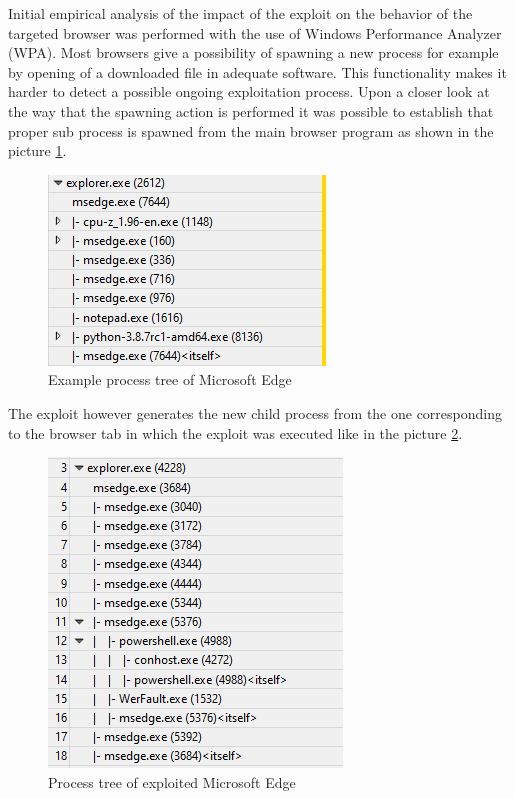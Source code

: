 \documentclass[a4paper,twoside,12pt]{book}
\begin{document}
Initial empirical analysis of the impact of the exploit on the behavior of the targeted browser was 
performed with the use of Windows Performance Analyzer (WPA).  Most browsers give a 
possibility of spawning a new process for example by opening of a downloaded file in 
adequate software. This functionality makes it harder to detect a possible ongoing exploitation process. 
Upon a closer look at the way that the spawning action is performed it was possible to establish that proper 
sub process is spawned from the main browser program as shown in the picture \ref{fig:WPAnormal}.

\begin{figure}
	\centering
	\includegraphics{images/wpa_normal}
	\caption{Example process tree of Microsoft Edge}
	\label{fig:WPAnormal}
 \end{figure}

The exploit however generates the new child process from the one corresponding to the browser tab 
in which the exploit was executed like in the picture \ref{fig:WPAexploit}. 

\begin{figure}
	\centering
	\includegraphics{images/wpa_exploit}
	\caption{Process tree of exploited Microsoft Edge}
	\label{fig:WPAexploit}
 \end{figure}
\end{document}
